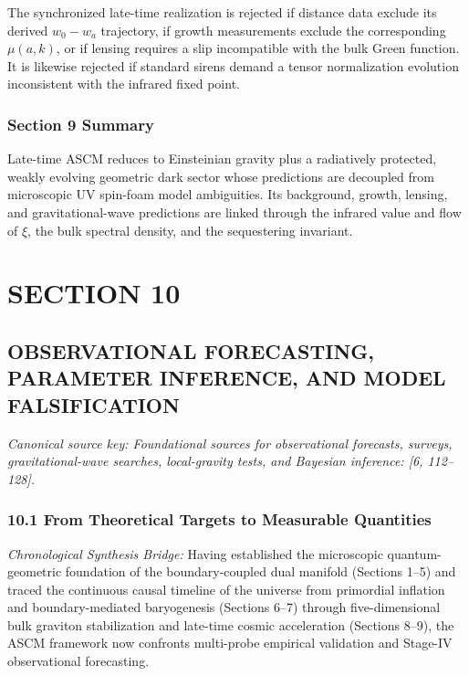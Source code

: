 \documentclass[aps,prd,onecolumn,superscriptaddress,nofootinbib,longbibliography,10pt]{revtex4-2}
\begin{document}
  The synchronized late-time realization is rejected if distance data exclude its derived \(w_0 - w_a\) trajectory, if growth measurements exclude the corresponding \(\mu(a,k)\), or if lensing requires a slip incompatible with the bulk Green function. It is likewise rejected if standard sirens demand a tensor normalization evolution inconsistent with the infrared fixed point.


  
\subsubsection*{Section 9 Summary}

  Late-time ASCM reduces to Einsteinian gravity plus a radiatively protected, weakly evolving geometric dark sector whose predictions are decoupled from microscopic UV spin-foam model ambiguities. Its background, growth, lensing, and gravitational-wave predictions are linked through the infrared value and flow of \(\xi\), the bulk spectral density, and the sequestering invariant.




 

  
\section*{SECTION 10}

  
\subsection*{OBSERVATIONAL FORECASTING, PARAMETER INFERENCE, AND MODEL FALSIFICATION}

  \textit{Canonical source key: Foundational sources for observational forecasts, surveys, gravitational-wave searches, local-gravity tests, and Bayesian inference: [6, 112–128].}


  
\subsubsection*{10.1 From Theoretical Targets to Measurable Quantities}

\textit{Chronological Synthesis Bridge:} Having established the microscopic quantum-geometric foundation of the boundary-coupled dual manifold (Sections 1--5) and traced the continuous causal timeline of the universe from primordial inflation and boundary-mediated baryogenesis (Sections 6--7) through five-dimensional bulk graviton stabilization and late-time cosmic acceleration (Sections 8--9), the ASCM framework now confronts multi-probe empirical validation and Stage-IV observational forecasting.
\end{document}
